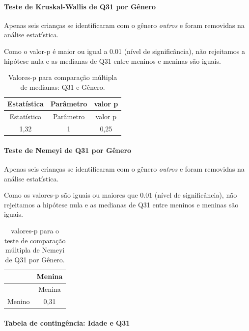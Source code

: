 \documentclass[]{article}
\let\oldparagraph\paragraph
\renewcommand{\paragraph}[1]{\oldparagraph{#1}\mbox{}}
\begin{document}
\hypertarget{teste-de-kruskal-wallis-de-q31-por-guxeanero}{%
\paragraph{Teste de Kruskal-Wallis de Q31 por Gênero}\label{teste-de-kruskal-wallis-de-q31-por-guxeanero}}

Apenas seis crianças se identificaram com o gênero \emph{outros} e foram removidas na análise estatística.

Como o valor-p é maior ou igual a 0.01 (nível de significância), não rejeitamos a hipótese nula e as medianas de Q31 entre meninos e meninas são iguais.

\begin{longtable}[]{@{}ccc@{}}
\caption{\label{tab:unnamed-chunk-1033}Valores-p para comparação múltipla de medianas: Q31 e Gênero.}\tabularnewline
\toprule
Estatística & Parâmetro & valor p\tabularnewline
\midrule
\endfirsthead
\toprule
Estatística & Parâmetro & valor p\tabularnewline
\midrule
\endhead
1,32 & 1 & 0,25\tabularnewline
\bottomrule
\end{longtable}

\hypertarget{teste-de-nemeyi-de-q31-por-guxeanero}{%
\paragraph{Teste de Nemeyi de Q31 por Gênero}\label{teste-de-nemeyi-de-q31-por-guxeanero}}

Apenas seis crianças se identificaram com o gênero \emph{outros} e foram removidas na análise estatística.

Como os valores-p são iguais ou maiores que 0.01 (nível de significância), não rejeitamos a hipótese nula e as medianas de Q31 entre meninos e meninas são iguais.

\begin{longtable}[]{@{}lc@{}}
\caption{\label{tab:unnamed-chunk-1035}valores-p para o teste de comparação múltipla de Nemeyi de Q31 por Gênero.}\tabularnewline
\toprule
& Menina\tabularnewline
\midrule
\endfirsthead
\toprule
& Menina\tabularnewline
\midrule
\endhead
Menino & 0,31\tabularnewline
\bottomrule
\end{longtable}

\cleardoublepage

\hypertarget{tabela-de-continguxeancia-idade-e-q31}{%
\paragraph{Tabela de contingência: Idade e Q31}\label{tabela-de-continguxeancia-idade-e-q31}}
\end{document}
